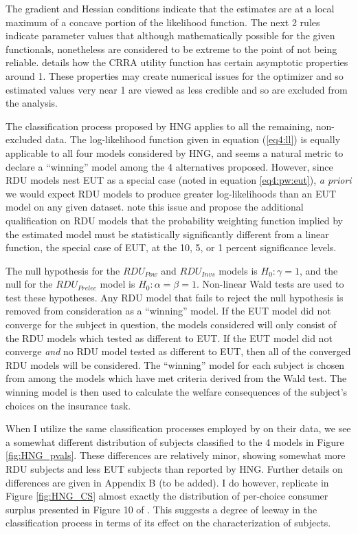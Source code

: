 \documentclass[../main.tex]{subfiles}
\begin{document}
\noindent The gradient and Hessian conditions indicate that the estimates are at a local maximum of a concave portion of the likelihood function.
The next 2 rules indicate parameter values that although mathematically possible for the given functionals, nonetheless are considered to be extreme to the point of not being reliable.
\textcite{Wakker2008} details how the CRRA utility function has certain asymptotic properties around 1.
These properties may create numerical issues for the optimizer and so estimated values very near 1 are viewed as less credible and so are excluded from the analysis.

The classification process proposed by HNG applies to all the remaining, non-excluded data.
The log-likelihood function given in equation (\ref{eq4:ll}) is equally applicable to all four models considered by HNG, and seems a natural metric to declare a \enquote{winning} model among the 4 alternatives proposed.
However, since RDU models nest EUT as a special case (noted in equation \ref{eq4:pw:eut}), \textit{a priori} we would expect RDU models to produce greater log-likelihoods than an EUT model on any given dataset.
\textcite[102]{Harrison2016} note this issue and propose the additional qualification on RDU models that the probability weighting function implied by the estimated model must be statistically significantly different from a linear function, the special case of EUT, at the 10, 5, or 1 percent significance levels.

The null hypothesis for the $\mathit{RDU_{Pow}}$ and $\mathit{RDU_{Invs}}$ models is $H_0: \gamma = 1$, and the null for the $\mathit{RDU_{Prelec}}$ model is $H_0: \alpha = \beta = 1$.
Non-linear Wald tests are used to test these hypotheses.
Any RDU model that fails to reject the null hypothesis is removed from consideration as a \enquote{winning} model.
If the EUT model did not converge for the subject in question, the models considered will only consist of the RDU models which tested as different to EUT.
If the EUT model did not converge \textit{and} no RDU model tested as different to EUT, then all of the converged RDU models will be considered.
The \enquote{winning} model for each subject is chosen from among the models which have met criteria derived from the Wald test.
The winning model is then used to calculate the welfare consequences of the subject's choices on the insurance task.

When I utilize the same classification processes employed by \textcite{Harrison2016} on their data, we see a somewhat different distribution of subjects classified to the 4 models in Figure \ref{fig:HNG_pvals}.
These differences are relatively minor, showing somewhat more RDU subjects and less EUT subjects than reported by HNG.
Further details on differences are given in Appendix B (to be added).
I do however, replicate in Figure \ref{fig:HNG_CS} almost exactly the distribution of per-choice consumer surplus presented in Figure 10 of \textcite[108]{Harrison2016}.
This suggests a degree of leeway in the classification process in terms of its effect on the characterization of subjects.
\end{document}
